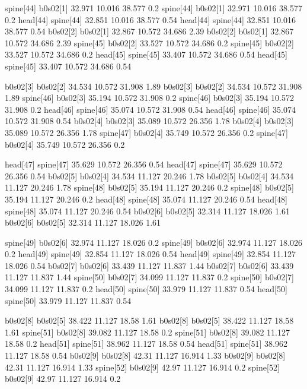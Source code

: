 spine[44]    b0s02[1]    32.971    10.016    38.577    0.2
spine[44]    b0s02[1]    32.971    10.016    38.577    0.2
head[44]    spine[44]    32.851    10.016    38.577    0.54
head[44]    spine[44]    32.851    10.016    38.577    0.54
b0s02[2]    b0s02[1]    32.867    10.572    34.686    2.39
b0s02[2]    b0s02[1]    32.867    10.572    34.686    2.39
spine[45]    b0s02[2]    33.527    10.572    34.686    0.2
spine[45]    b0s02[2]    33.527    10.572    34.686    0.2
head[45]    spine[45]    33.407    10.572    34.686    0.54
head[45]    spine[45]    33.407    10.572    34.686    0.54


b0s02[3]    b0s02[2]    34.534    10.572    31.908    1.89
b0s02[3]    b0s02[2]    34.534    10.572    31.908    1.89
spine[46]    b0s02[3]    35.194    10.572    31.908    0.2
spine[46]    b0s02[3]    35.194    10.572    31.908    0.2
head[46]    spine[46]    35.074    10.572    31.908    0.54
head[46]    spine[46]    35.074    10.572    31.908    0.54
b0s02[4]    b0s02[3]    35.089    10.572    26.356    1.78
b0s02[4]    b0s02[3]    35.089    10.572    26.356    1.78
spine[47]    b0s02[4]    35.749    10.572    26.356    0.2
spine[47]    b0s02[4]    35.749    10.572    26.356    0.2


head[47]    spine[47]    35.629    10.572    26.356    0.54
head[47]    spine[47]    35.629    10.572    26.356    0.54
b0s02[5]    b0s02[4]    34.534    11.127    20.246    1.78
b0s02[5]    b0s02[4]    34.534    11.127    20.246    1.78
spine[48]    b0s02[5]    35.194    11.127    20.246    0.2
spine[48]    b0s02[5]    35.194    11.127    20.246    0.2
head[48]    spine[48]    35.074    11.127    20.246    0.54
head[48]    spine[48]    35.074    11.127    20.246    0.54
b0s02[6]    b0s02[5]    32.314    11.127    18.026    1.61
b0s02[6]    b0s02[5]    32.314    11.127    18.026    1.61


spine[49]    b0s02[6]    32.974    11.127    18.026    0.2
spine[49]    b0s02[6]    32.974    11.127    18.026    0.2
head[49]    spine[49]    32.854    11.127    18.026    0.54
head[49]    spine[49]    32.854    11.127    18.026    0.54
b0s02[7]    b0s02[6]    33.439    11.127    11.837    1.44
b0s02[7]    b0s02[6]    33.439    11.127    11.837    1.44
spine[50]    b0s02[7]    34.099    11.127    11.837    0.2
spine[50]    b0s02[7]    34.099    11.127    11.837    0.2
head[50]    spine[50]    33.979    11.127    11.837    0.54
head[50]    spine[50]    33.979    11.127    11.837    0.54


b0s02[8]    b0s02[5]    38.422    11.127    18.58    1.61
b0s02[8]    b0s02[5]    38.422    11.127    18.58    1.61
spine[51]    b0s02[8]    39.082    11.127    18.58    0.2
spine[51]    b0s02[8]    39.082    11.127    18.58    0.2
head[51]    spine[51]    38.962    11.127    18.58    0.54
head[51]    spine[51]    38.962    11.127    18.58    0.54
b0s02[9]    b0s02[8]    42.31    11.127    16.914    1.33
b0s02[9]    b0s02[8]    42.31    11.127    16.914    1.33
spine[52]    b0s02[9]    42.97    11.127    16.914    0.2
spine[52]    b0s02[9]    42.97    11.127    16.914    0.2


